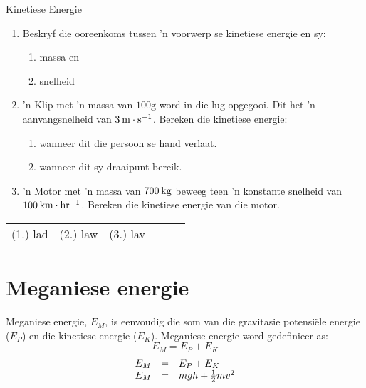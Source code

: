 \begin{exercises}{Kinetiese Energie }
            \nopagebreak
        \label{m38785*id68123}\begin{enumerate}[noitemsep, label=\textbf{\arabic*}. ] 
            \label{m38785*uid69}\item Beskryf die ooreenkoms tussen   'n voorwerp se kinetiese energie en sy:
\label{m38785*id68139}\begin{enumerate}[noitemsep, label=\textbf{\alph*}. ] 
            \label{m38785*uid70}\item  massa en
\label{m38785*uid71}\item snelheid
\end{enumerate}
                \label{m38785*uid72}\item   'n Klip met   'n massa van $100 \text{g}$ word in die lug opgegooi. Dit het   'n aanvangsnelheid van $3\phantom{\rule{2pt}{0ex}}\text{m}\ensuremath{\cdot}\text{s}{}^{-1}$. Bereken die kinetiese energie:
\label{m38785*id68206}\begin{enumerate}[noitemsep, label=\textbf{\alph*}. ] 
            \label{m38785*uid73}\item wanneer dit die persoon se hand verlaat.
\label{m38785*uid74}\item  wanneer dit sy draaipunt bereik.
\end{enumerate}
                \label{m38785*uid75}\item   'n Motor met   'n massa van $700\phantom{\rule{2pt}{0ex}}\text{kg}$ beweeg teen   'n konstante snelheid van $100\phantom{\rule{2pt}{0ex}}\text{km}\ensuremath{\cdot}\text{hr}{}^{-1}$. Bereken die kinetiese energie van die motor.
\end{enumerate}
  \label{m38785**end}
\practiceinfo
 \par \begin{tabular}[h]{cccccc}
 (1.) lad  &  (2.) law  &  (3.) lav  & \end{tabular}
\end{exercises}
         \section{Meganiese energie}
    \nopagebreak
      \label{m38786*id68299}Meganiese energie, ${E}_{M}$, is eenvoudig die som van die gravitasie potensi\"{e}le energie (${E}_{P}$) en die kinetiese energie (${E}_{K}$). Meganiese energie word gedefinieer as:
      \label{m38786*uid76}\nopagebreak\noindent{}
    \begin{equation}
    {E}_{M}={E}_{P}+{E}_{K}
      \end{equation}
      \label{m38786*uid77}\nopagebreak\noindent{}
    \begin{equation}
    \begin{array}{ccc}\hfill {E}_{M}& =& {E}_{P}+{E}_{K}\hfill \\ \hfill {E}_{M}& =& mgh+\frac{1}{2}m{v}^{2}\hfill \end{array}
      \end{equation}
      \label{m38786*eip-384}
      \label{m38786*uid78}
            

